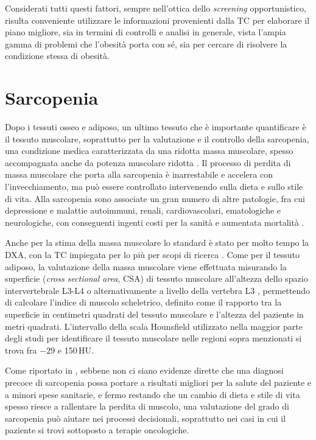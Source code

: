 Considerati tutti questi fattori, sempre nell'ottica dello \textit{screening} opportunistico, risulta conveniente utilizzare le informazioni provenienti dalla TC per elaborare il piano migliore, sia in termini di controlli e analisi in generale, vista l’ampia gamma di problemi che l’obesità porta con sé, sia per cercare di risolvere la condizione stessa di obesità.

\section{Sarcopenia}
Dopo i tessuti osseo e adiposo, un ultimo tessuto che è importante quantificare è il tessuto muscolare, soprattutto per la valutazione e il controllo della sarcopenia, una condizione medica caratterizzata da una ridotta massa muscolare, spesso accompagnata anche da potenza muscolare ridotta \cite{Cruz-Jentoft2010, Murray2017}. Il processo di perdita di massa muscolare che porta alla sarcopenia è inarrestabile e accelera con l’invecchiamento, ma può essere controllato intervenendo sulla dieta e sullo stile di vita. Alla sarcopenia sono associate un gran numero di altre patologie, fra cui depressione e malattie autoimmuni, renali, cardiovascolari, ematologiche e neurologiche, con conseguenti ingenti costi per la sanità e aumentata mortalità \cite{Murray2017}.

Anche per la stima della massa muscolare lo standard è stato per molto tempo la DXA, con la TC impiegata per lo più per scopi di ricerca \cite{Janssen2000}. Come per il tessuto adiposo, la valutazione della massa muscolare viene effettuata misurando la superficie (\textit{cross sectional area}, CSA) di tessuto muscolare all'altezza dello spazio intervertebrale L3-L4 o alternativamente a livello della vertebra L3 \cite{Murray2017}, permettendo di calcolare l’indice di muscolo scheletrico, definito come il rapporto tra la superficie in centimetri quadrati del tessuto muscolare e l’altezza del paziente in metri quadrati. L'intervallo della scala Hounsfield utilizzato nella maggior parte degli studi per identificare il tessuto muscolare nelle regioni sopra menzionati si trova fra $-29$ e 150\,HU.

Come riportato in \cite{Murray2017}, sebbene non ci siano evidenze dirette che una diagnosi precoce di sarcopenia possa portare a risultati migliori per la salute del paziente e a minori spese sanitarie, e fermo restando che un cambio di dieta e stile di vita spesso riesce a rallentare la perdita di muscolo, una valutazione del grado di sarcopenia può aiutare nei processi decisionali, soprattutto nei casi in cui il paziente si trovi sottoposto a terapie oncologiche.

